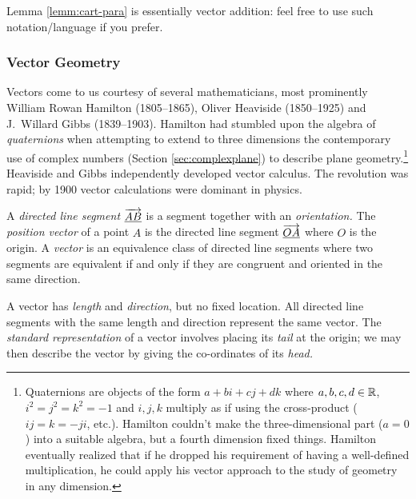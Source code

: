 Lemma \ref{lemm:cart-para} is essentially vector addition: feel free to use such notation/language if you prefer.\smallbreak




\iffalse
\subsubsection*{Vector Geometry}

Vectors come to us courtesy of several mathematicians, most prominently William Rowan Hamilton (1805--1865), Oliver Heaviside (1850--1925) and J.~Willard Gibbs (1839--1903). Hamilton had stumbled upon the algebra of \emph{quaternions} when attempting to extend to three dimensions the contemporary use of complex numbers (Section \ref{sec:complexplane}) to describe plane geometry.\footnote{Quaternions are objects of the form $a+bi+cj+dk$ where $a,b,c,d\in\mathbb{R}$, $i^2=j^2=k^2=-1$ and $i,j,k$ multiply as if using the cross-product ($ij=k=-ji$, etc.). Hamilton couldn't make the three-dimensional part ($a=0$) into a suitable algebra, but a fourth dimension fixed things. Hamilton eventually realized that if he dropped his requirement of having a well-defined multiplication, he could apply his vector approach to the study of geometry in any dimension. %
} Heaviside and Gibbs %
independently developed vector calculus. The revolution was rapid; by 1900 vector calculations were dominant in physics. 

\begin{defn}{}{}
A \emph{directed line segment} $\overrightarrow{\underline{AB}}$ is a segment together with an \emph{orientation.}\footnotemark\smallbreak
The \emph{position vector} of a point $A$ is the directed line segment $\overrightarrow{\underline{OA}}$ where $O$ is the origin.\smallbreak
A \emph{vector} is an equivalence class of directed line segments where two segments are equivalent if and only if they are congruent and oriented in the same direction.
\end{defn}


A vector has \emph{length} and \emph{direction}, but no fixed location. All directed line segments with the same length and direction represent the same vector. The \emph{standard representation} of a vector involves placing its \emph{tail} at the origin; we may then describe the vector by giving the co-ordinates of its \emph{head.}

